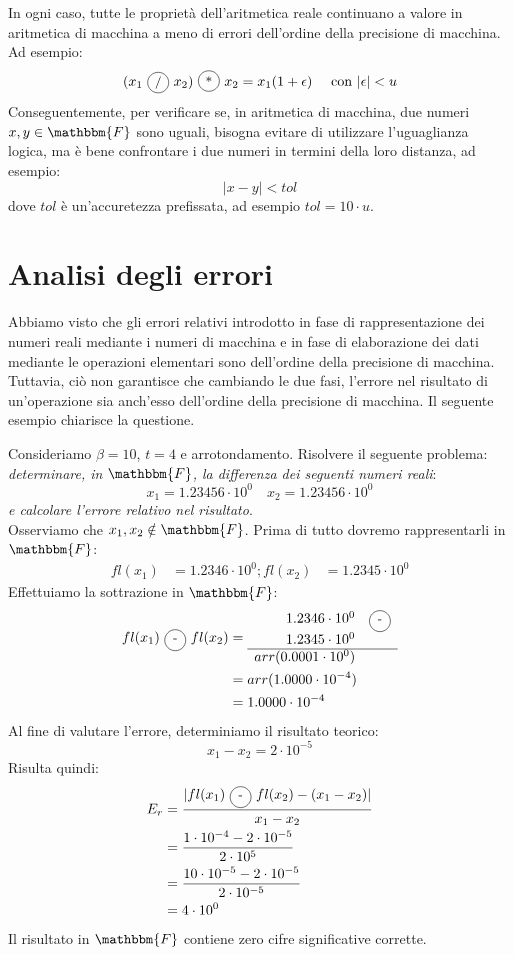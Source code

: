 \documentclass[12pt]{report}
\newcommand{\circled}[1]{%
	\begin{tikzpicture}[baseline=(char.base)]
		\node[shape=circle, draw, inner sep=1.2pt, minimum size=1.5em] (char) {\small #1};
	\end{tikzpicture}%
}
\begin{document}
In ogni caso, tutte le proprietà dell'aritmetica reale continuano a valore in aritmetica di macchina a meno di errori dell'ordine della precisione di macchina. Ad esempio:
\[
(x_1\ \circled{/}\ x_2)\ \circled{*}\ x_2 = x_1(1 + \epsilon) \quad \text{ con } |\epsilon| < u
\]
Conseguentemente, per verificare se, in aritmetica di macchina, due numeri $x, y \in \mathbbm{F}$ sono uguali, bisogna evitare di utilizzare l'uguaglianza logica, ma è bene confrontare i due numeri in termini della loro distanza, ad esempio:
\[
|x - y| < tol
\]
dove $tol$ è un'accuretezza prefissata, ad esempio $tol = 10 \cdot u$.
\section{Analisi degli errori}
Abbiamo visto che gli errori relativi introdotto in fase di rappresentazione dei numeri reali mediante i numeri di macchina e in fase di elaborazione dei dati mediante le operazioni elementari sono dell'ordine della precisione di macchina. \\
Tuttavia, ciò non garantisce che cambiando le due fasi, l'errore nel risultato di un'operazione sia anch'esso dell'ordine della precisione di macchina. Il seguente esempio chiarisce la questione.
\begin{example}{}{}
	Consideriamo $\beta = 10$, $t = 4$ e arrotondamento. Risolvere il seguente problema: \textit{determinare, in $\mathbbm{F}$, la differenza dei seguenti numeri reali}:
	\[
	x_1 = 1.23456 \cdot 10^0 \quad x_2 = 1.23456 \cdot 10^0
	\]
	\textit{e calcolare l'errore relativo nel risultato}. \\
	Osserviamo che $x_1, x_2 \notin \mathbbm{F}$. Prima di tutto dovremo rappresentarli in $\mathbbm{F}$:
	\begin{align*}
		fl(x_1) &= 1.2346 \cdot 10^0;
		fl(x_2) &= 1.2345 \cdot 10^0
	\end{align*}
	Effettuiamo la sottrazione in $\mathbbm{F}$:
	\begin{align*}
		fl(x_1)\ \circled{-}\ fl(x_2) &=
		\begin{array}{r@{\quad}l}
			1.2346 \cdot 10^{0} & \circled{-} \\
			1.2345 \cdot 10^0 &  \\
			\hline
			arr(0.0001 \cdot 10^0) &
		\end{array} \\
		&= arr(1.0000 \cdot 10^{-4}) \\
		&= 1.0000 \cdot 10^{-4}
	\end{align*}
	Al fine di valutare l'errore, determiniamo il risultato teorico:
	\[
	x_1 - x_2 = 2 \cdot 10^{-5}
	\]
	Risulta quindi:
	\begin{align*}
		E_r &= \frac{|fl(x_1)\ \circled{-}\ fl(x_2) - (x_1 - x_2)|}{x_1 - x_2} \\
		&= \frac{1 \cdot 10^{-4} - 2\cdot 10^{-5}}{2 \cdot 10^{5}} \\
		&= \frac{10 \cdot 10^{-5} - 2 \cdot 10^{-5}}{2 \cdot 10^{-5}}\\
		&= 4 \cdot 10^0
	\end{align*}
	Il risultato in $\mathbbm{F}$ contiene zero cifre significative corrette.
\end{example}
\end{document}
